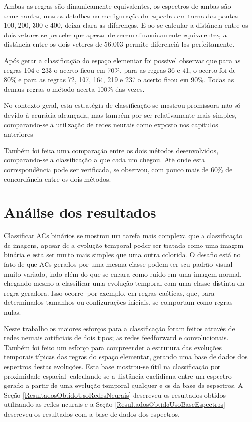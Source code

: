 \documentclass[12pt,a4paper]{report}
\begin{document}
	Ambas as regras são dinamicamente equivalentes, os espectros de ambas são semelhantes, mas os detalhes na configuração do espectro em torno dos pontos 100, 200, 300 e 400, deixa clara as diferenças. E ao se calcular a distância entre os dois vetores se percebe que apesar de serem dinamicamente equivalentes, a distância entre os dois vetores de 56.003 permite diferenciá-los perfeitamente.
	
	Após gerar a classificação do espaço elementar foi possível observar que para as regras 104 e 233 o acerto ficou em 70\%, para as regras 36 e 41, o acerto foi de 80\% e para as regras 72, 107, 164, 219 e 237 o acerto ficou em 90\%. Todas as demais regras o método acerta 100\% das vezes.
	
	No contexto geral, esta estratégia de classificação se mostrou promissora não só devido à acurácia alcançada, mas também por ser relativamente mais simples, comparando-se à utilização de redes neurais como exposto nos capítulos anteriores.
	
	Também foi feita uma comparação entre os dois métodos desenvolvidos, comparando-se a classificação a que cada um chegou. Até onde esta correspondência pode ser verificada, se observou, com pouco mais de 60\% de concordância entre os dois métodos.
	
	
	\chapter{Análise dos resultados}
	\label{cap:resultados}
	
	Classificar ACs binários se mostrou um tarefa mais complexa que a classificação de imagens, apesar de a evolução temporal poder ser tratada como uma imagem binária e esta ser muito mais simples que uma outra colorida. O desafio está no fato de que ACs gerados por uma mesma classe podem ter seu padrão visual muito variado, indo além do que se encara como ruído em uma imagem normal, chegando mesmo a classificar uma evolução temporal com uma classe distinta da regra geradora. Isso ocorre, por exemplo, em regras caóticas, que, para determinados tamanhos ou configurações iniciais, se comportam como regras nulas.
	
	Neste trabalho os maiores esforços para a classificação foram feitos através de redes neurais artificiais de dois tipos; as redes feedforward e convolucionais. Também foi feito um esforço para compreender a estrutura das evoluções temporais típicas das regras do espaço elementar, gerando uma base de dados dos espectros destas evoluções. Esta base mostrou-se útil na classificação por proximidade espacial, calculando-se a distância euclidiana entre um espectro gerado a partir de uma evolução temporal qualquer e os da base de espectros. A Seção \ref{ResultadosObtidoUsoRedesNeurais} descreveu os resultados obtidos utilizando as redes neurais e a Seção \ref{ResultadosObtidoUsoBaseEspectros} descreveu os resultados com a base de dados dos espectros.
	
\end{document}

